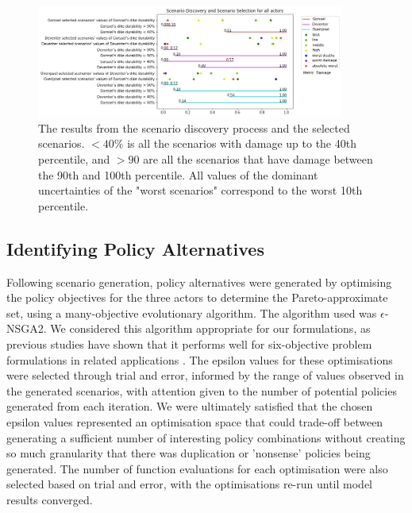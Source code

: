 \begin{figure}[h!]
    \centering
    \includegraphics[width=0.9\textwidth]{report/figures/results/scenario_discovery.png}
    \caption[width=0.8\linewidth]{The results from the scenario discovery process and the selected scenarios. $<40\%$ is all the scenarios with damage up to the 40th percentile, and $>90$ are all the scenarios that have damage between the 90th and 100th percentile. All values of the dominant uncertainties of the "worst scenarios" correspond to the worst 10th percentile.}
    \label{fig:prim}
\end{figure}

\subsection{Identifying Policy Alternatives}

Following scenario generation, policy alternatives were generated by optimising the policy objectives for the three actors to determine the Pareto-approximate set, using a many-objective evolutionary algorithm. The algorithm used was $\epsilon$-NSGA2. We considered this algorithm appropriate for our formulations, as previous studies have shown that it performs well for six-objective problem formulations in related applications \parencite{salazar_diagnostic_2016}. The epsilon values for these optimisations were selected through trial and error, informed by the range of values observed in the generated scenarios, with attention given to the number of potential policies generated from each iteration. We were ultimately satisfied that the chosen epsilon values represented an optimisation space that could trade-off between generating a sufficient number of interesting policy combinations without creating so much granularity that there was duplication or 'nonsense' policies being generated. The number of function evaluations for each optimisation were also selected based on trial and error, with the optimisations re-run until model results converged.

